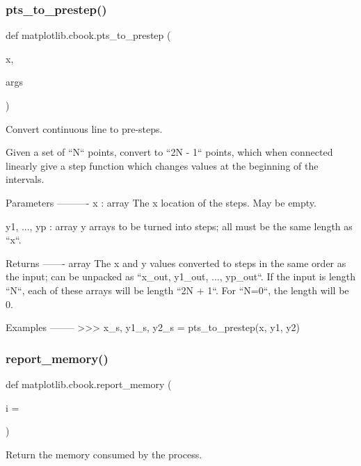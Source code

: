 \subsubsection{\texorpdfstring{pts\+\_\+to\+\_\+prestep()}{pts\_to\_prestep()}}
{\footnotesize\ttfamily def matplotlib.\+cbook.\+pts\+\_\+to\+\_\+prestep (\begin{DoxyParamCaption}\item[{}]{x,  }\item[{}]{args }\end{DoxyParamCaption})}

\begin{DoxyVerb}Convert continuous line to pre-steps.

Given a set of ``N`` points, convert to ``2N - 1`` points, which when
connected linearly give a step function which changes values at the
beginning of the intervals.

Parameters
----------
x : array
    The x location of the steps. May be empty.

y1, ..., yp : array
    y arrays to be turned into steps; all must be the same length as ``x``.

Returns
-------
array
    The x and y values converted to steps in the same order as the input;
    can be unpacked as ``x_out, y1_out, ..., yp_out``.  If the input is
    length ``N``, each of these arrays will be length ``2N + 1``. For
    ``N=0``, the length will be 0.

Examples
--------
>>> x_s, y1_s, y2_s = pts_to_prestep(x, y1, y2)
\end{DoxyVerb}
 \mbox{\label{namespacematplotlib_1_1cbook_a535511c13efe4c9961e0c49ad906fe8b}} 
\subsubsection{\texorpdfstring{report\+\_\+memory()}{report\_memory()}}
{\footnotesize\ttfamily def matplotlib.\+cbook.\+report\+\_\+memory (\begin{DoxyParamCaption}\item[{}]{i = {} }\end{DoxyParamCaption})}

\begin{DoxyVerb}Return the memory consumed by the process.\end{DoxyVerb}
 \mbox{\label{namespacematplotlib_1_1cbook_a6a6f0c198d6daf339623a024c000ced9}} 

